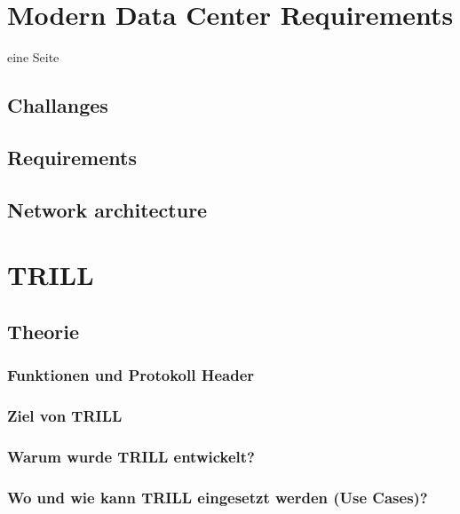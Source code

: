 

\newcommand{\SUBJECT}{Report}
\newcommand{\TITLE}{Cloud Infrastructre Lab 6}



\section{Modern Data Center Requirements} %

eine Seite

\subsection{Challanges}
\subsection{Requirements}
\subsection{Network architecture}
\section{TRILL}

\subsection{Theorie}
\subsubsection{Funktionen und Protokoll Header} %

\subsubsection{Ziel von TRILL} %

\subsubsection{Warum wurde TRILL entwickelt?} %

\subsubsection{Wo und wie kann TRILL eingesetzt werden (Use Cases)?} %

